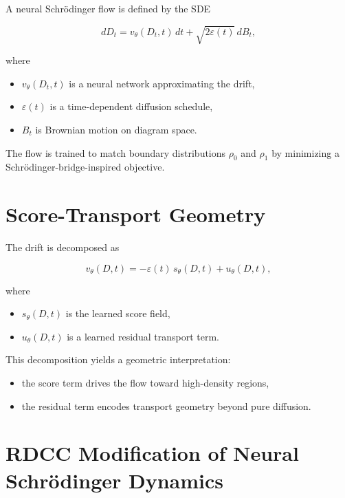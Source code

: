 \documentclass[11pt,a4paper]{article}
\begin{document}
A neural Schrödinger flow is defined by the SDE

\begin{equation}
    dD_{t}
    = v_{\theta}(D_{t}, t) \, dt
    + \sqrt{2 \varepsilon(t)} \, dB_{t},
\end{equation}

where

\begin{itemize}
    \item $v_{\theta}(D_{t}, t)$ is a neural network approximating the drift,
    \item $\varepsilon(t)$ is a time-dependent diffusion schedule,
    \item $B_{t}$ is Brownian motion on diagram space.
\end{itemize}

The flow is trained to match boundary distributions $\rho_{0}$ and $\rho_{1}$ by 
minimizing a Schrödinger-bridge-inspired objective.
\section{Score-Transport Geometry}

The drift is decomposed as

\begin{equation}
    v_{\theta}(D, t)
    = - \varepsilon(t) \, s_{\theta}(D, t)
      + u_{\theta}(D, t),
\end{equation}

where

\begin{itemize}
    \item $s_{\theta}(D, t)$ is the learned score field,
    \item $u_{\theta}(D, t)$ is a learned residual transport term.
\end{itemize}

This decomposition yields a geometric interpretation:

\begin{itemize}
    \item the score term drives the flow toward high-density regions,
    \item the residual term encodes transport geometry beyond pure diffusion.
\end{itemize}
\section{RDCC Modification of Neural Schrödinger Dynamics}
\end{document}
